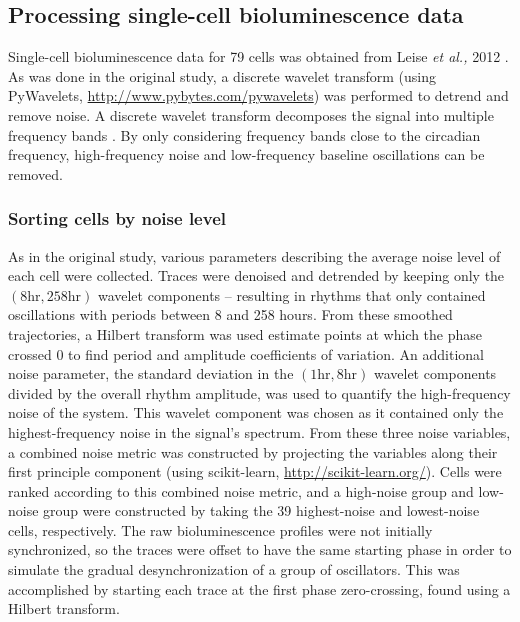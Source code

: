 \documentclass[11pt, letterpaper]{article}
\begin{document}
\subsection*{Processing single-cell bioluminescence data}

Single-cell bioluminescence data for 79 cells was obtained from Leise {\itshape et al.,} 2012 \cite{Leise2012}.
As was done in the original study, a discrete wavelet transform (using PyWavelets, \url{http://www.pybytes.com/pywavelets}) was performed to detrend and remove noise.
A discrete wavelet transform decomposes the signal into multiple frequency bands \cite{Leise2011}. 
By only considering frequency bands close to the circadian frequency, high-frequency noise and low-frequency baseline oscillations can be removed.

\subsubsection*{Sorting cells by noise level}
As in the original study, various parameters describing the average noise level of each cell were collected.
Traces were denoised and detrended by keeping only the $(8 \text{hr}, 258 \text{hr})$ wavelet components -- resulting in rhythms that only contained oscillations with periods between 8 and 258 hours.
From these smoothed trajectories, a Hilbert transform was used estimate points at which the phase crossed $0$ to find period and amplitude coefficients of variation.
An additional noise parameter, the standard deviation in the $(1 \text{hr}, 8 \text{hr})$ wavelet components divided by the overall rhythm amplitude, was used to quantify the high-frequency noise of the system.
This wavelet component was chosen as it contained only the highest-frequency noise in the signal's spectrum.
From these three noise variables, a combined noise metric was constructed by projecting the variables along their first principle component (using scikit-learn, \url{http://scikit-learn.org/}).
Cells were ranked according to this combined noise metric, and a high-noise group and low-noise group were constructed by taking the 39 highest-noise and lowest-noise cells, respectively.
The raw bioluminescence profiles were not initially synchronized, so the traces were offset to have the same starting phase in order to simulate the gradual desynchronization of a group of oscillators. 
This was accomplished by starting each trace at the first phase zero-crossing, found using a Hilbert transform.
\end{document}
